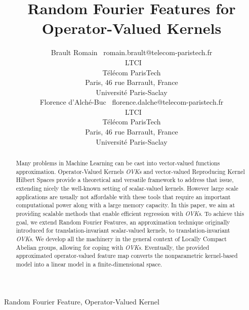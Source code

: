 \documentclass[twoside,11pt]{article}
\begin{document}
\title{Random Fourier Features for Operator-Valued Kernels}

\author{\name{}Brault Romain
       \email~romain.brault@telecom-paristech.fr \\
       \addr~LTCI\\
       T\'el\'ecom ParisTech\\
       Paris, 46 rue Barrault, France \\
       Universit\'e Paris-Saclay \\
       \AND%
       \name{}Florence d'Alch\'e-Buc
       \email~florence.dalche@telecom-paristech.fr \\
       \addr~LTCI\\
       T\'el\'ecom ParisTech\\
       Paris, 46 rue Barrault, France \\
       Universit\'e Paris-Saclay}


\maketitle

\begin{abstract}%
    Many problems in Machine Learning can be cast into vector-valued functions
    approximation. Operator-Valued Kernels \emph{\aclp{OVK}} and vector-valued
    Reproducing Kernel Hilbert Spaces provide a theoretical and versatile
    framework to address that issue, extending nicely the well-known setting of
    scalar-valued kernels.  However large scale applications are usually not
    affordable with these tools that require an important computational power
    along with a large memory capacity. In this paper, we aim at providing
    scalable methods that enable efficient regression with \emph{\aclp{OVK}}.
    To achieve this goal, we extend Random Fourier Features, an approximation
    technique originally introduced for translation-invariant scalar-valued
    kernels, to translation-invariant \emph{\aclp{OVK}}. We develop all the
    machinery in the general context of Locally Compact Abelian groups,
    allowing for coping with  \emph{\aclp{OVK}}. Eventually,  the provided
    approximated operator-valued feature map converts the nonparametric
    kernel-based model into a linear model in a finite-dimensional space.
\end{abstract}
\begin{keywords}
    Random Fourier Feature, Operator-Valued Kernel
\end{keywords}
\end{document}
